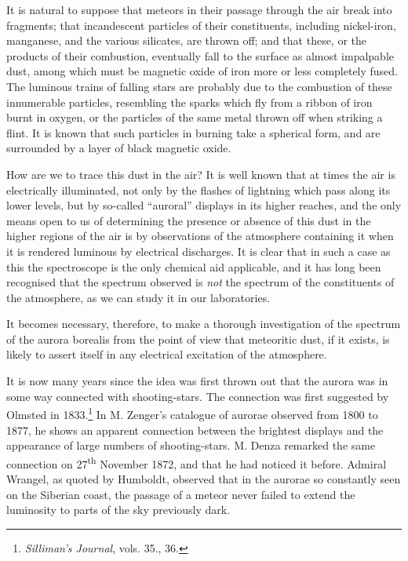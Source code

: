\documentclass[a4paper, 12pt, oneside, polutonikogreek, english]{article}
\begin{document}
It is natural to suppose that meteors in their passage through the air break into fragments; that incandescent particles of their constituents, including nickel-iron, manganese, and the various silicates, are thrown off; and that these, or the products of their combustion, eventually fall to the surface as almost impalpable dust, among which must be magnetic oxide of iron more or less completely fused. The luminous trains of falling stars are probably due to the combustion of these innumerable particles, resembling the sparks which fly from a ribbon of iron burnt in oxygen, or the particles of the same metal thrown off when striking a flint. It is known that such particles in burning take a spherical form, and are surrounded by a layer of black magnetic oxide.

How are we to trace this dust in the air? It is well known that at times the air is electrically illuminated, not only by the flashes of lightning which pass along its lower levels, but by so-called ``auroral'' displays in its higher reaches, and the only means open to us of determining the presence or absence of this dust in the higher regions of the air is by observations of the atmosphere containing it when it is rendered luminous by electrical discharges. It is clear that in such a case as this the spectroscope is the only chemical aid applicable, and it has long been recognised that the spectrum observed is \emph{not} the spectrum of the constituents of the atmosphere, as we can study it in our laboratories.

It becomes necessary, therefore, to make a thorough investigation of the spectrum of the aurora borealis from the point of view that meteoritic dust, if it exists, is likely to assert itself in any electrical excitation of the atmosphere.

It is now many years since the idea was first thrown out that the aurora was in some way connected with shooting-stars. The connection was first suggested by Olmsted in 1833.\footnote{\emph{Silliman's Journal}, vols. 35., 36.} In M. Zenger's catalogue of aurorae observed from 1800 to 1877, he shows an apparent connection between the brightest displays and the appearance of large numbers of shooting-stars. M. Denza remarked the same connection on 27\textsuperscript{th} November 1872, and that he had noticed it before. Admiral Wrangel, as quoted by Humboldt, observed that in the aurorae so constantly seen on the Siberian coast, the passage of a meteor never failed to extend the luminosity to parts of the sky previously dark.
\end{document}
